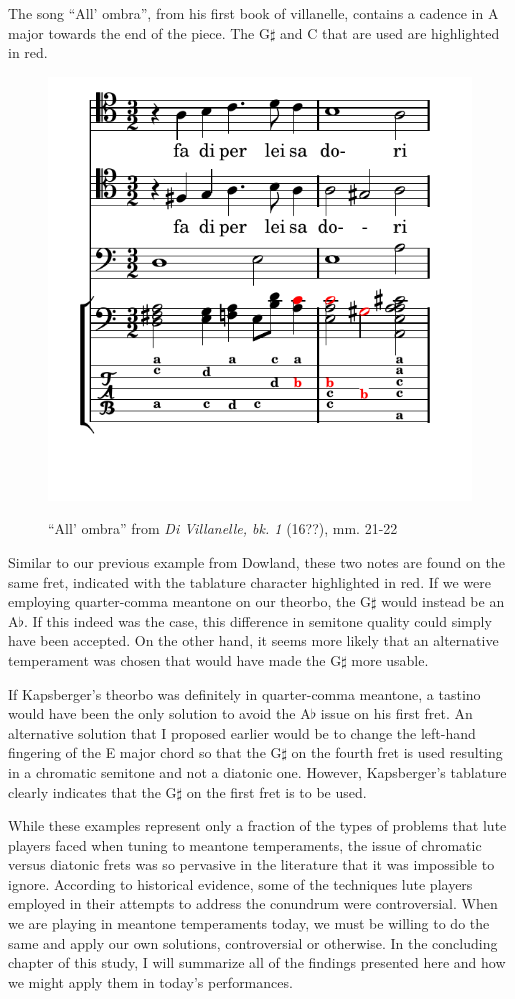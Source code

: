 The song ``All' ombra'', from his first book of villanelle, contains a cadence in A major
towards the end of the piece. The G$\sharp$ and C that are used are highlighted in red.
\begin{figure}[h]
\centering
\includegraphics{examples/kaps_ombria.pdf}
\label{kaps-ombria}
\caption{``All' ombra'' from \textit{Di Villanelle, bk. 1} (16??), mm. 21-22 }
\end{figure}
Similar to our previous example from Dowland, these two notes are found on the
same fret, indicated with the tablature character  highlighted in red.
If we were employing quarter-comma meantone on our theorbo, the G$\sharp$ would
instead be an A$\flat$. If this indeed was the case, this difference in semitone
quality could simply have been accepted. On the other hand, it seems more
likely that an alternative temperament was chosen that would have made the
G$\sharp$ more usable.

If Kapsberger's theorbo was definitely in quarter-comma meantone, a tastino would have been the only solution to avoid
the A$\flat$ issue on his first fret. An alternative solution that I proposed earlier would be to change the left-hand
fingering of the E major chord so that the G$\sharp$ on the fourth fret is used resulting in a chromatic semitone and
not a diatonic one. However, Kapsberger's tablature clearly indicates that the G$\sharp$ on the first fret is to be
used.

While these examples represent only a fraction of the types of problems that lute players faced when tuning to meantone
temperaments, the issue of chromatic versus diatonic frets was so pervasive in the literature that it was impossible to
ignore. According to historical evidence, some of the techniques lute players employed in their attempts to address the
conundrum were controversial. When we are playing in meantone temperaments today, we must be willing to do the same and
apply our own solutions, controversial or otherwise. In the concluding chapter of this study, I will summarize all of
the findings presented here and how we might apply them in today's performances.
